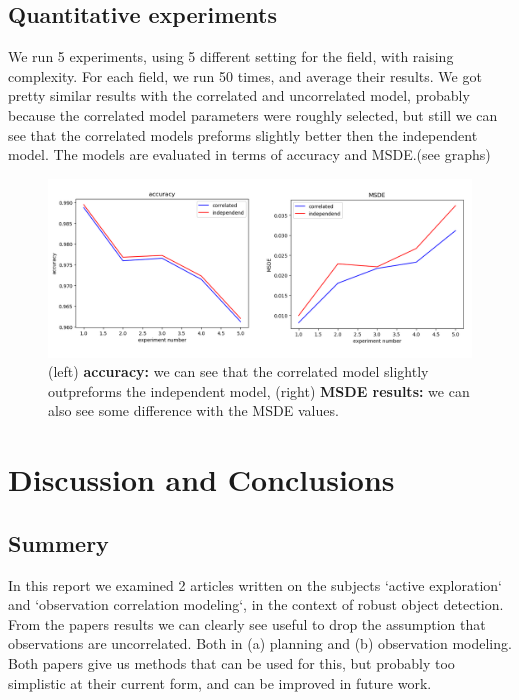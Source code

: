\documentclass{article}
\begin{document}
	
	\subsection{Quantitative experiments}
	We run 5 experiments, using 5 different setting for the field, with raising complexity.  For each field, we run 50 times, and average their results.
	We got pretty similar results with the correlated and uncorrelated model, probably because the correlated model parameters were roughly selected, but still we can see that the correlated models preforms slightly better then the independent model. The models are evaluated in terms of accuracy and MSDE.(see graphs)
	
	\begin{figure}[!h]
		\centering
		\includegraphics[width=0.9\linewidth, height=0.3\textheight]{../figures/independent_vs_correlated_graphes}
		\caption{(left) \textbf{accuracy:} we can see that the correlated model slightly outpreforms the independent model, (right) \textbf{MSDE results:} we can also see some difference with the MSDE values.}
		\label{fig:results}
	\end{figure}
	
	
	\section{Discussion and Conclusions}
	
	\subsection{Summery}
	In this report we examined 2 articles written on the subjects `active exploration` and `observation correlation modeling`,
	in the context of robust object detection. From the papers results we can clearly see useful to drop the assumption that observations are uncorrelated.
	Both in (a) planning and (b) observation modeling. Both papers give us methods that can be used for this, but probably too simplistic at their current form, and can be improved in future work.
	
\end{document}
